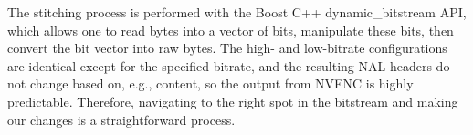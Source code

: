The stitching process is performed with the Boost C++ dynamic\_bitstream API, which allows one to read bytes into a vector of bits, manipulate these bits, then convert the bit vector into raw bytes. The high- and low-bitrate configurations are identical except for the specified bitrate, and the resulting NAL headers do not change based on, e.g., content, so the output from NVENC is highly predictable. Therefore, navigating to the right spot in the bitstream and making our changes is a straightforward process.

